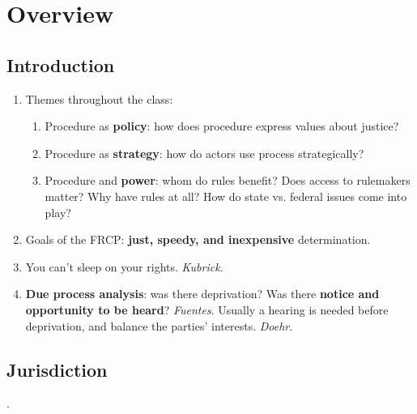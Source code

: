 \section{Overview}

\subsection{Introduction}

\begin{enumerate}
    \item Themes throughout the class:
    \begin{enumerate}
        \item Procedure as \textbf{policy}: how does procedure express values 
        about justice?
        \item Procedure as \textbf{strategy}: how do actors use process 
        strategically?
        \item Procedure and \textbf{power}: whom do rules benefit? Does access 
        to rulemakers matter? Why have rules at all? How do state vs. federal 
        issues come into play?
    \end{enumerate}
    \item Goals of the FRCP: \textbf{just, speedy, and inexpensive} 
    determination.
    \item You can't sleep on your rights. \emph{Kubrick}.
    \item \textbf{Due process analysis}: was there deprivation? Was there 
    \textbf{notice and opportunity to be heard}? \emph{Fuentes}. Usually a 
    hearing is needed before deprivation, and balance the parties' interests.  
    \emph{Doehr}.  \end{enumerate}

\subsection{Jurisdiction}.

